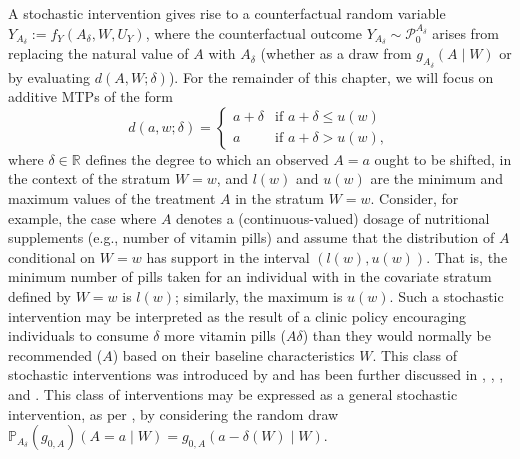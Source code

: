 \documentclass[
  12pt, krantz2,
]{krantz}
\renewcommand{\P}{\mathbb{P}}
\newcommand{\1}{\mathbbm{1}}
\theoremstyle{definition}
\theoremstyle{definition}
\theoremstyle{definition}
\theoremstyle{definition}
\theoremstyle{remark}
\begin{document}
A stochastic intervention gives rise to a counterfactual random variable
\(Y_{A_{\delta}} := f_Y(A_{\delta}, W, U_Y)\), where the counterfactual outcome
\(Y_{A_{\delta}} \sim \mathcal{P}_0^{A_{\delta}}\) arises from replacing the
natural value of \(A\) with \(A_{\delta}\) (whether as a draw from
\(g_{A_{\delta}}(A \mid W)\) or by evaluating \(d(A, W; \delta)\)). For the
remainder of this chapter, we will focus on additive MTPs of the form
\begin{equation}
  d(a, w; \delta) =
  \begin{cases}
    a + \delta & \text{if } a + \delta \leq u(w) \\
    a & \text{if } a + \delta > u(w),
  \end{cases}
  \label{eq:shift}
\end{equation}
where \(\delta \in \mathbb{R}\) defines the degree to which an observed \(A = a\)
ought to be shifted, in the context of the stratum \(W = w\), and \(l(w)\) and
\(u(w)\) are the minimum and maximum values of the treatment \(A\) in the stratum
\(W = w\). Consider, for example, the case where \(A\) denotes a (continuous-valued)
dosage of nutritional supplements (e.g., number of vitamin pills) and assume
that the distribution of \(A\) conditional on \(W = w\) has support in the interval
\((l(w), u(w))\). That is, the minimum number of pills taken for an individual
with in the covariate stratum defined by \(W = w\) is \(l(w)\); similarly, the
maximum is \(u(w)\). Such a stochastic intervention may be interpreted as the
result of a clinic policy encouraging individuals to consume \(\delta\) more
vitamin pills (\(A \delta\)) than they would normally be recommended (\(A\)) based
on their baseline characteristics \(W\). This class of stochastic interventions
was introduced by \citet{diaz2012population} and has been further discussed in
\citet{haneuse2013estimation}, \citet{diaz2018stochastic}, \citet{hejazi2020efficient}, and
\citet{hejazi2021semiparametric}. This class of interventions may be expressed as a
general stochastic intervention, as per \citet{diaz2012population}, by considering the
random draw \(\P_{A_{\delta}}(g_{0, A})(A = a \mid W) = g_{0,A}(a - \delta(W) \mid W)\).
\end{document}
